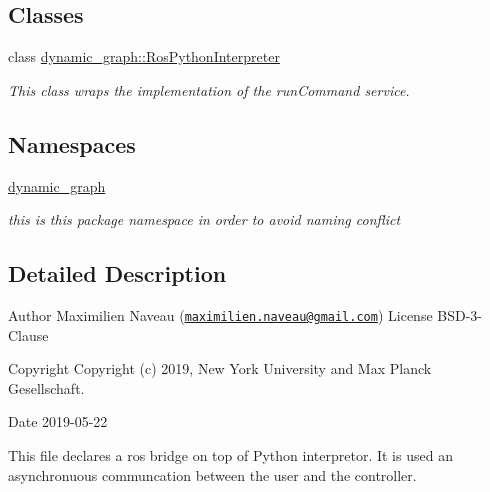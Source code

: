 \subsection*{Classes}
\begin{DoxyCompactItemize}
\item 
class \hyperlink{classdynamic__graph_1_1RosPythonInterpreter}{dynamic\+\_\+graph\+::\+Ros\+Python\+Interpreter}
\begin{DoxyCompactList}\small\item\em This class wraps the implementation of the run\+Command service. \end{DoxyCompactList}\end{DoxyCompactItemize}
\subsection*{Namespaces}
\begin{DoxyCompactItemize}
\item 
 \hyperlink{namespacedynamic__graph}{dynamic\+\_\+graph}
\begin{DoxyCompactList}\small\item\em this is this package namespace in order to avoid naming conflict \end{DoxyCompactList}\end{DoxyCompactItemize}


\subsection{Detailed Description}
\begin{DoxyAuthor}{Author}
Maximilien Naveau (\href{mailto:maximilien.naveau@gmail.com}{\tt maximilien.\+naveau@gmail.\+com})  License B\+S\+D-\/3-\/\+Clause 
\end{DoxyAuthor}
\begin{DoxyCopyright}{Copyright}
Copyright (c) 2019, New York University and Max Planck Gesellschaft. 
\end{DoxyCopyright}
\begin{DoxyDate}{Date}
2019-\/05-\/22
\end{DoxyDate}
This file declares a ros bridge on top of Python interpretor. It is used an asynchronuous communcation between the user and the controller. 